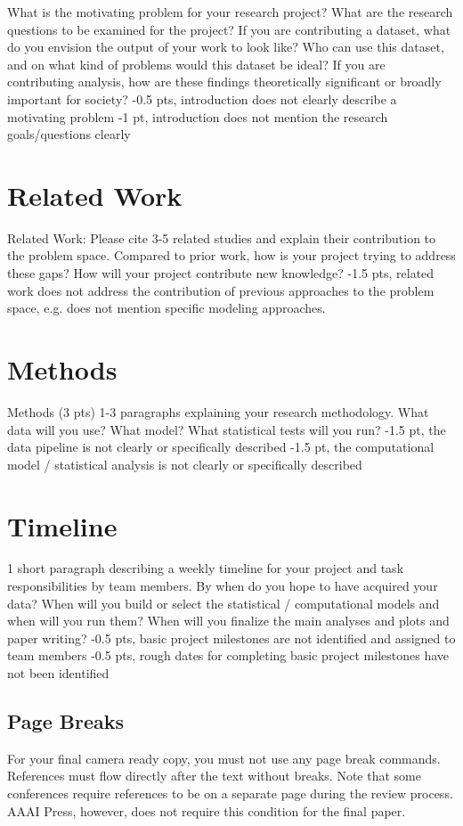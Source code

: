 \documentclass[letterpaper]{article} %
\begin{document}
What is the motivating problem for your research project? What are the research questions to be examined for the project? If you are contributing a dataset, what do you envision the output of your work to look like? Who can use this dataset, and on what kind of problems would this dataset be ideal? If you are contributing analysis, how are these findings theoretically significant or broadly important for society?
-0.5 pts, introduction does not clearly describe a motivating problem
-1 pt, introduction does not mention the research goals/questions clearly

\section{Related Work}
Related Work: Please cite 3-5 related studies and explain their contribution to the problem space. Compared to prior work, how is your project trying to address these gaps? How will your project contribute new knowledge?
-1.5 pts, related work does not address the contribution of previous approaches to the problem space, e.g. does not mention specific modeling approaches.

\section{Methods}
Methods (3 pts)
1-3 paragraphs explaining your research methodology. What data will you use? What model? What statistical tests will you run?
-1.5 pt, the data pipeline is not clearly or specifically described 
-1.5 pt, the computational model / statistical analysis is not clearly or specifically described 




\section{Timeline}
1 short paragraph describing a weekly timeline for your project and task responsibilities by team members. By when do you hope to have acquired your data? When will you build or select the statistical / computational models and when will you run them? When will you finalize the main analyses and plots and paper writing? 
-0.5 pts, basic project milestones are not identified and assigned to team members
-0.5 pts, rough dates for completing basic project milestones have not been identified




\subsection{Page Breaks}
For your final camera ready copy, you must not use any page break commands. References must flow directly after the text without breaks. Note that some conferences require references to be on a separate page during the review process. AAAI Press, however, does not require this condition for the final paper.
\end{document}
